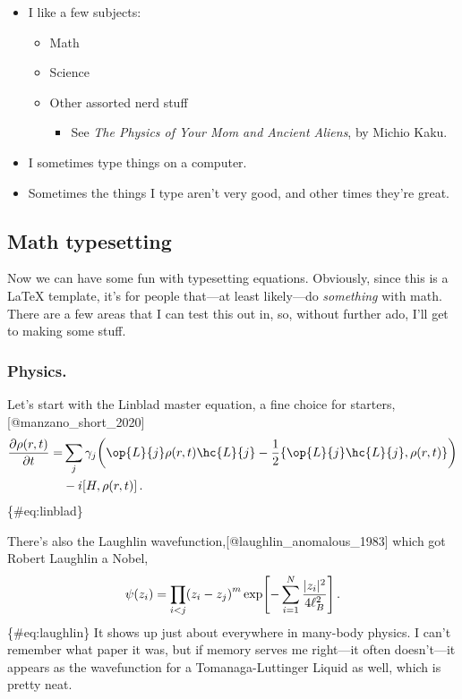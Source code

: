 \documentclass[%
	english,%
	 a4paper,%
	titlepage,%
	fleqn]{article}
\providecommand{\tightlist}{%
  \setlength{\itemsep}{0pt}\setlength{\parskip}{0pt}}
\let\originalleft\left
\let\originalright\right
\renewcommand{\left}{\mathopen{}\mathclose\bgroup\originalleft}
\renewcommand{\right}{\aftergroup\egroup\originalright}
\begin{document}
\begin{itemize}
\tightlist
\item
  I like a few subjects:

  \begin{itemize}
  \tightlist
  \item
    Math
  \item
    Science
  \item
    Other assorted nerd stuff

    \begin{itemize}
    \tightlist
    \item
      See \emph{The Physics of Your Mom and Ancient Aliens}, by Michio
      Kaku.
    \end{itemize}
  \end{itemize}
\item
  I sometimes type things on a computer.
\item
  Sometimes the things I type aren't very good, and other times they're
  great.
\end{itemize}

\subsection{Math typesetting}\label{math-typesetting}

Now we can have some fun with typesetting equations. Obviously, since
this is a {\LaTeX} template, it's for people that---at least likely---do
\emph{something} with math. There are a few areas that I can test this
out in, so, without further ado, I'll get to making some stuff.

\subsubsection{Physics.}\label{physics.}

Let's start with the Linblad master equation, a fine choice for
starters,{[}@manzano\_short\_2020{]} \[ \begin{aligned}
\diffp{\rho(r, t)}{t} = 
& \sum_j \gamma_j \left( \op{L}{j} \rho(r, t) \hc{L}{j}
- \frac{1}{2} \left\{ \op{L}{j} \hc{L}{j}, \rho(r, t) \right\} \right) \\
& - i \left[ H, \rho(r, t) \right] \,. \end{aligned} \] \{\#eq:linblad\}

There's also the Laughlin wavefunction,{[}@laughlin\_anomalous\_1983{]}
which got Robert Laughlin a Nobel,
\[ \psi( z_i ) = \prod_{i < j} \left( z_i - z_j \right)^m
\exp \left[ -\sum_{i = 1}^{N} \frac{| z_i |^2}{4 \ell_B^2}
\right] \,. \] \{\#eq:laughlin\} It shows up just about everywhere in
many-body physics. I can't remember what paper it was, but if memory
serves me right---it often doesn't---it appears as the wavefunction for
a Tomanaga-Luttinger Liquid as well, which is pretty neat.
\end{document}
